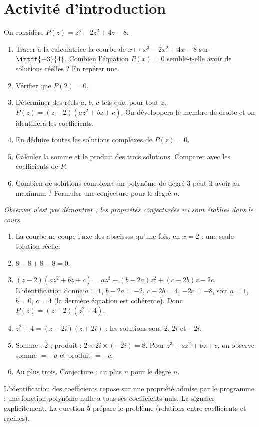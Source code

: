\section{Activité d'introduction}
\begin{activity}
On considère $P(z)=z^3-2z^2+4z-8$.
\begin{enumerate}
\item Tracer à la calculatrice la courbe de $x\mapsto x^3-2x^2+4x-8$ sur $\intff{-3}{4}$. Combien l'équation $P(x)=0$ semble-t-elle avoir de solutions réelles ? En repérer une.
\item Vérifier que $P(2)=0$.
\item Déterminer des réels $a$, $b$, $c$ tels que, pour tout $z$, $P(z)=(z-2)\left(az^2+bz+c\right)$. On développera le membre de droite et on identifiera les coefficients.
\item En déduire toutes les solutions complexes de $P(z)=0$.
\item Calculer la somme et le produit des trois solutions. Comparer avec les coefficients de $P$.
\item Combien de solutions complexes un polynôme de degré $3$ peut-il avoir au maximum ? Formuler une conjecture pour le degré $n$.
\end{enumerate}
\par\emph{Observer n'est pas démontrer : les propriétés conjecturées ici sont établies dans le cours.}
\end{activity}
\begin{solution}[Activité]
\begin{enumerate}
\item La courbe ne coupe l'axe des abscisses qu'une fois, en $x=2$ : une seule solution réelle.
\item $8-8+8-8=0$.
\item $(z-2)\left(az^2+bz+c\right)=az^3+(b-2a)z^2+(c-2b)z-2c$. L'identification donne $a=1$, $b-2a=-2$, $c-2b=4$, $-2c=-8$, soit $a=1$, $b=0$, $c=4$ (la dernière équation est cohérente). Donc $P(z)=(z-2)\left(z^2+4\right)$.
\item $z^2+4=(z-2i)(z+2i)$ : les solutions sont $2$, $2i$ et $-2i$.
\item Somme : $2$ ; produit : $2\times2i\times(-2i)=8$. Pour $z^3+az^2+bz+c$, on observe somme $=-a$ et produit $=-c$.
\item Au plus trois. Conjecture : au plus $n$ pour le degré $n$.
\end{enumerate}
\end{solution}
\begin{teachernote}
L'identification des coefficients repose sur une propriété admise par le programme : une fonction polynôme nulle a tous ses coefficients nuls. La signaler explicitement. La question 5 prépare le problème (relations entre coefficients et racines).
\end{teachernote}

